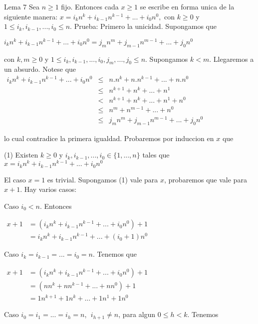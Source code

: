 Lema 7 Sea \(n\geq 1\) fijo. Entonces cada \(x\geq 1\) se escribe en forma unica de la siguiente manera:
\(\displaystyle x=i_{k}n^{k}+i_{k-1}n^{k-1}+...+i_{0}n^{0}, \)
con \(k\geq 0\) y \(1\leq i_{k},i_{k-1},...,i_{0}\leq n\).
Prueba: Primero la unicidad. Supongamos que

\(\displaystyle i_{k}n^{k}+i_{k-1}n^{k-1}+...+i_{0}n^{0}=j_{m}n^{m}+j_{m-1}n^{m-1}+...+j_{0}n^{0} \)

con \(k,m\geq 0\) y \(1\leq i_{k},i_{k-1},...,i_{0},j_{m},...,j_{0}\leq n\). Supongamos \(k< m\). Llegaremos a un absurdo. Notese que
\(\displaystyle \begin{array}{ccl} i_{k}n^{k}+i_{k-1}n^{k-1}+...+i_{0}n^{0} & \leq & n.n^{k}+n.n^{k-1}+...+n.n^{0} \\ & \leq & n^{k+1}+n^{k}+...+n^{1} \\ & < & n^{k+1}+n^{k}+...+n^{1}+n^{0} \\ & \leq & n^{m}+n^{m-1}+...+n^{0} \\ & \leq & j_{m}n^{m}+j_{m-1}n^{m-1}+...+j_{0}n^{0} \end{array} \)

lo cual contradice la primera igualdad.
Probaremos por induccion en \(x\) que

(1) Existen \(k\geq 0\) y \(i_{k},i_{k-1},...,i_{0}\in \{1,...,n\}\) tales que
\(\displaystyle x=i_{k}n^{k}+i_{k-1}n^{k-1}+...+i_{0}n^{0} \)

El caso \(x=1\) es trivial. Supongamos (1) vale para \(x\), probaremos que vale para \(x+1\). Hay varios casos:

Caso \(i_{0}< n\). Entonces

\(\displaystyle \begin{array}{ll} x+1 & =\left( i_{k}n^{k}+i_{k-1}n^{k-1}+...+i_{0}n^{0}\right) +1 \\ & =i_{k}n^{k}+i_{k-1}n^{k-1}+...+(i_{0}+1)n^{0} \end{array} \)

Caso \(i_{k}=i_{k-1}=...=i_{0}=n\). Tenemos que

\(\displaystyle \begin{array}{ll} x+1 & =\left( i_{k}n^{k}+i_{k-1}n^{k-1}+...+i_{0}n^{0}\right) +1 \\ & =\left( nn^{k}+nn^{k-1}+...+nn^{0}\right) +1 \\ & =1n^{k+1}+1n^{k}+...+1n^{1}+1n^{0} \end{array} \)

Caso \(i_{0}=i_{1}=...=i_{h}=n\), \(\;i_{h+1}\not=n\), para algun \( 0\leq h< k\). Tenemos

